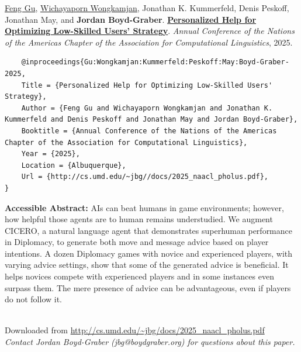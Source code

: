 \documentclass[a4paper]{article}
\begin{document}
    \underline{Feng Gu}, \underline{\href{https://wwongkamjan.github.io}{Wichayaporn Wongkamjan}}, Jonathan K. Kummerfeld, Denis Peskoff, Jonathan May, and {\bf Jordan Boyd-Graber}.  {\bf \href{http://cs.umd.edu/~jbg//docs/2025_naacl_pholus.pdf}{Personalized Help for Optimizing Low-Skilled Users' Strategy}}.  \emph{Annual Conference of the Nations of the Americas Chapter of the Association for Computational Linguistics}, 2025.



    \vspace{5cm}

    \begin{verbatim}
    @inproceedings{Gu:Wongkamjan:Kummerfeld:Peskoff:May:Boyd-Graber-2025,
	Title = {Personalized Help for Optimizing Low-Skilled Users' Strategy},
	Author = {Feng Gu and Wichayaporn Wongkamjan and Jonathan K. Kummerfeld and Denis Peskoff and Jonathan May and Jordan Boyd-Graber},
	Booktitle = {Annual Conference of the Nations of the Americas Chapter of the Association for Computational Linguistics},
	Year = {2025},
	Location = {Albuquerque},
	Url = {http://cs.umd.edu/~jbg//docs/2025_naacl_pholus.pdf},
}

    \end{verbatim}

    {\bf Accessible Abstract:} AIs can beat humans in game environments; however, how helpful those agents are to human remains understudied. We augment CICERO, a natural language agent that demonstrates superhuman performance in Diplomacy, to generate both move and message advice based on player intentions. A dozen Diplomacy games with novice and experienced players, with varying advice settings, show that some of the generated advice is beneficial. It helps novices compete with experienced players and in some instances even surpass them. The mere presence of advice can be advantageous, even if players do not follow it.\\~

    

    

    \vspace{3cm}
    Downloaded from \url{http://cs.umd.edu/~jbg/docs/2025_naacl_pholus.pdf}  \\

    \vspace{2cm}
    \textit{Contact Jordan Boyd-Graber (jbg@boydgraber.org) for questions about this paper.}

    

    
\end{document}
